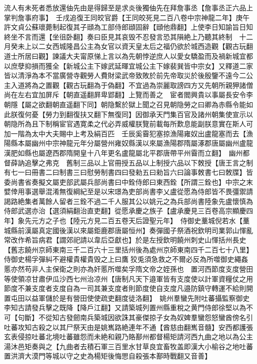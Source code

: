 流人有未死者悉放還伷先由是得歸至是求炎後獨伷先在拜詹事丞【詹事丞正六品上掌判詹事府事】　壬戌追復王同皎官爵【王同皎死見二百八卷中宗神龍二年】庚午許文貞公蘇瓌薨制起復其子頲為工部侍郎頲固辭【頲他鼎翻】上使李日知諭旨日知終坐不言而還【坐徂卧翻】奏曰臣見其哀毁不忍發言恐其隕絶上乃聽其終制　十二月癸未上以二女西城隆昌公主為女官以資天皇太后之福仍欲於城西造觀【觀古玩翻道士所居曰觀】諫議大夫甯原悌上言以為先朝悖逆庶人以愛女驕盈而及禍新城宜都以庶孽抑損而獲全【新城公主下嫁武延暉宜城公主下嫁裴巽皆中宗女】又釋道二家皆以清淨為本不當廣營寺觀勞人費財梁武帝致敗於前先帝取災於後殷鑒不遠今二公主入道將為之置觀【觀古玩翻為于偽翻】不宜過為崇麗取謗四方又先朝所親狎諸僧尚在左右宜加屏斥【朝直遥翻屛卑郢翻】上覽而善之　宦者閻興貴以事屬長安令李朝隱【屬之欲翻朝直遥翻下同】朝隐繫於獄上聞之召見朝隐勞之曰卿為赤縣令能如此朕復何憂【勞力到翻復扶又翻下無復同】因御承天門集百官及諸州朝集使宣示以朝隐所為且下制稱宦官遇寛柔之代必弄威權朕覽前載每所歎息能副朕意實在斯人可加一階為太中大夫賜中上考及絹百匹　壬辰奚霫犯塞掠漁陽雍奴出盧龍塞而去【漁陽縣本屬幽州中宗神龍元年分屬營州雍奴縣漢以來屬漁陽郡隋屬涿郡唐屬幽州盧龍漢肥如縣也屬遼西郡隋開皇十八年更名盧龍屬北平郡唐帶平州霫而立翻】　幽州都督薛訥追擊之弗克　舊制三品以上官冊授五品以上制授六品以下敇授【唐王言之制有七一曰冊書二曰制書三曰慰勞制書四曰發勑五曰勑旨六曰論事敇書七曰敇牒】皆委尚書省奏擬文屬吏部武屬兵部尚書曰中銓侍郎曰東西銓【所謂三銓也】中宗之末嬖倖用事選舉混淆無復綱紀至是以宋璟為吏部尚書李乂盧從愿為侍郎皆不畏彊禦請謁路絶集者萬餘人留者三銓不過二千人服其公以姚元之為兵部尚書陸象先盧懷慎為侍郎武選亦治【選須絹翻治直吏翻】從愿承慶之族子【盧承慶見三百卷高宗顯慶四年】象先元方之子也【陸元方見二百五卷天后證聖元年】　侍御史藳城倪若水【藳城縣前漢屬真定國後漢以來屬鉅鹿郡唐屬恒州】奏彈國子祭酒祝欽明司業郭山惲亂常改作希旨病君【謂郊祀請以韋后亞獻也】於是左授欽明饒州刺史山惲括州長史【舊志饒州京師東南三千二百六十三里括州後為處州京師東南四千二百七十八里】　侍御史楊孚彈糾不避權貴權貴毁之上曰鷹狡兎須急救之不爾必反為所噬御史繩姦慝亦然苟非人主保衛之則亦為奸慝所噬矣孚隋文帝之姪孫也　置河西節度支度營田等使領凉甘肅伊瓜沙西七州治凉州【唐制凡天下邉軍皆有支度使以計軍資糧仗之用節度不兼支度者支度自為一司其兼支度者則節度使自支度凡邉防鎮守轉運不給則開置屯田以益軍儲於是有營田使使疏吏翻度徒洛翻】　姚州羣蠻先附吐蕃攝監察御史李知古請發兵擊之既降【降戶江翻】又請築城列置州縣重稅之黄門侍郎徐堅以為不可【句斷】不從知古發劒南兵築城因欲誅其豪傑掠子女為奴婢羣蠻怨怒蠻酋傍名引吐蕃攻知古殺之以其尸祭天由是姚嶲路絶連年不通【酋慈由翻嶲音髓】安西都護張玄表侵掠吐蕃北境吐蕃雖怨而未絶和親乃賂鄯州都督楊矩請河西九曲之地以為公主湯沐邑矩奏與之【九曲者去積石軍三百里水甘草良宜畜牧盖即漢大小榆谷之地吐蕃置洪濟大漠門等城以守之史為楊矩後悔愳自殺張本鄯時戰翻又音善】

